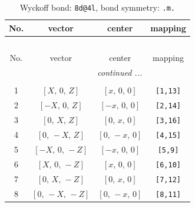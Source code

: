 \documentclass[fleqn,8pt]{jsarticle}
\begin{document}
\begin{longtable}{cccc}
\caption{Wyckoff bond: {\tt 8d@4l}, bond symmetry: {\tt .m.}}
 \\
 \hline \hline
No. & vector & center & mapping \\ \hline \endfirsthead

\multicolumn{3}{l}{\tablename\ \thetable{}} \\
 \hline \hline
No. & vector & center & mapping \\ \hline \endhead

 \hline \hline
\multicolumn{3}{r}{\footnotesize\it continued ...} \\ \endfoot

 \hline \hline
\multicolumn{3}{r}{} \\ \endlastfoot

1 & $\left[ X,\, 0,\, Z \right]$ & $\left[ x,\, 0,\, 0 \right]$ & {\tt [1,13]} \\ \hline
2 & $\left[ - X,\, 0,\, Z \right]$ & $\left[ - x,\, 0,\, 0 \right]$ & {\tt [2,14]} \\ \hline
3 & $\left[ 0,\, X,\, Z \right]$ & $\left[ 0,\, x,\, 0 \right]$ & {\tt [3,16]} \\ \hline
4 & $\left[ 0,\, - X,\, Z \right]$ & $\left[ 0,\, - x,\, 0 \right]$ & {\tt [4,15]} \\ \hline
5 & $\left[ - X,\, 0,\, - Z \right]$ & $\left[ - x,\, 0,\, 0 \right]$ & {\tt [5,9]} \\ \hline
6 & $\left[ X,\, 0,\, - Z \right]$ & $\left[ x,\, 0,\, 0 \right]$ & {\tt [6,10]} \\ \hline
7 & $\left[ 0,\, X,\, - Z \right]$ & $\left[ 0,\, x,\, 0 \right]$ & {\tt [7,12]} \\ \hline
8 & $\left[ 0,\, - X,\, - Z \right]$ & $\left[ 0,\, - x,\, 0 \right]$ & {\tt [8,11]} \\
\end{longtable}
\renewcommand{\arraystretch}{1.2}
\end{document}
